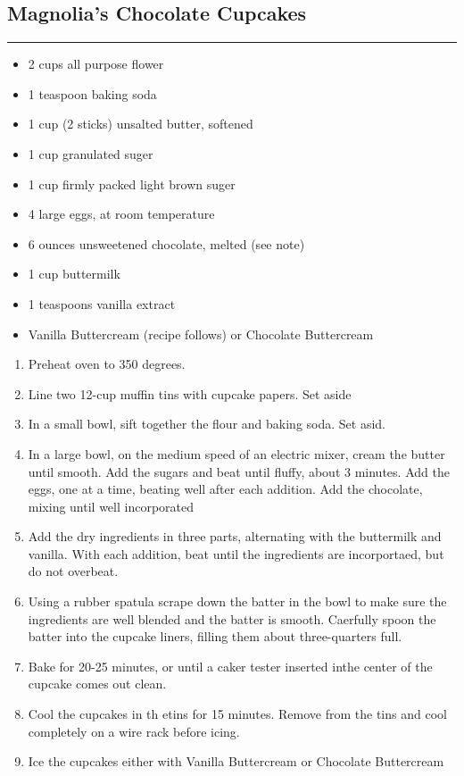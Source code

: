 \documentclass{article}
\begin{document}
\subsection{Magnolia's Chocolate Cupcakes} 
\noindent\rule[0.5ex]{\linewidth}{1pt}

\begin{framed}
    \begin{itemize}
        \item 2 cups all purpose flower
        \item 1 teaspoon baking soda
        \item 1 cup (2 sticks) unsalted butter, softened
        \item 1 cup granulated suger
        \item 1 cup firmly packed light brown suger
        \item 4 large eggs, at room temperature
        \item 6 ounces unsweetened chocolate, melted (see note)
        \item 1 cup buttermilk
        \item 1 teaspoons vanilla extract
        \item Vanilla Buttercream (recipe follows) or Chocolate Buttercream
    \end{itemize}
\end{framed}

\begin{enumerate}
    \item  
        Preheat oven to 350 degrees.
    \item 
        Line two 12-cup muffin tins with cupcake papers. Set aside
    \item  
        In a small bowl, sift together the flour and baking soda. Set asid.
    \item  
        In a large bowl, on the medium speed of an electric mixer, cream the butter until smooth. Add the sugars and beat until fluffy, about 3 minutes. Add the eggs, one at a time, beating well after each addition. Add the chocolate, mixing until well incorporated
    \item 
        Add the dry ingredients in three parts, alternating with the buttermilk and vanilla. With each addition, beat until the ingredients are incorportaed, but do not overbeat. 
    \item 
        Using a rubber spatula scrape down the batter in the bowl to make sure the ingredients are well blended and the batter is smooth. Caerfully spoon the batter into the cupcake liners, filling them about three-quarters full. 
    \item 
        Bake for 20-25 minutes, or until a caker tester inserted inthe center of the cupcake comes out clean.
    \item 
        Cool the cupcakes in th etins for 15 minutes. Remove from the tins and cool completely on a wire rack before icing. 
    \item 
        Ice the cupcakes either with Vanilla Buttercream or Chocolate Buttercream
\end{enumerate}
\end{document}
